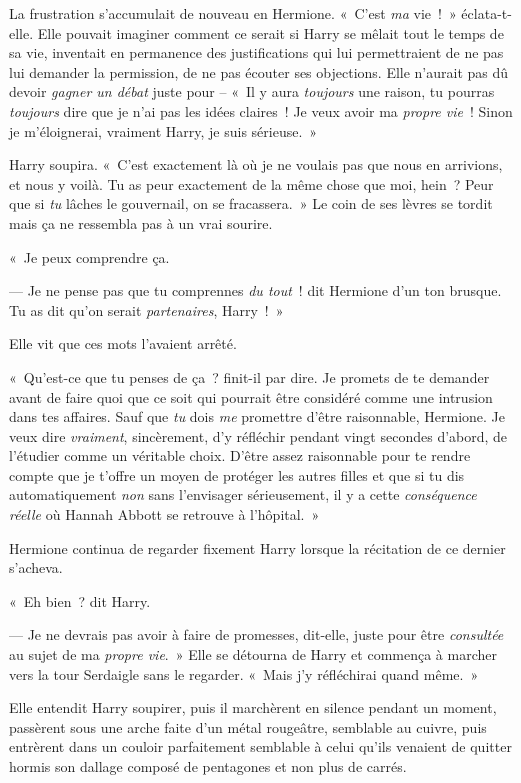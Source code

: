 La frustration s'accumulait de nouveau en Hermione.
«~C'est \emph{ma} vie~!~»
éclata-t-elle.
Elle pouvait imaginer comment ce serait si Harry se mêlait tout le temps de sa vie, inventait en permanence des justifications qui lui permettraient de ne pas lui demander la permission, de ne pas écouter ses objections.
Elle n'aurait pas dû devoir \emph{gagner un débat} juste pour -- «~Il y aura \emph{toujours} une raison, tu pourras \emph{toujours} dire que je n'ai pas les idées claires~!
Je veux avoir ma \emph{propre vie}~!
Sinon je m'éloignerai, vraiment Harry, je suis sérieuse.~»

Harry soupira.
«~C'est exactement là où je ne voulais pas que nous en arrivions, et nous y voilà.
Tu as peur exactement de la même chose que moi, hein~?
Peur que si \emph{tu} lâches le gouvernail, on se fracassera.~»
Le coin de ses lèvres se tordit mais ça ne ressembla pas à un vrai sourire.

«~Je peux comprendre ça.

--- Je ne pense pas que tu comprennes \emph{du tout}~! dit Hermione d'un ton brusque.
Tu as dit qu'on serait \emph{partenaires}, Harry~!~»

Elle vit que ces mots l'avaient arrêté.

«~Qu'est-ce que tu penses de ça~? finit-il par dire.
Je promets de te demander avant de faire quoi que ce soit qui pourrait être considéré comme une intrusion dans tes affaires.
Sauf que \emph{tu} dois \emph{me} promettre d'être raisonnable, Hermione.
Je veux dire \emph{vraiment}, sincèrement, d'y réfléchir pendant vingt secondes d'abord, de l'étudier comme un véritable choix.
D'être assez raisonnable pour te rendre compte que je t'offre un moyen de protéger les autres filles et que si tu dis automatiquement \emph{non} sans l'envisager sérieusement, il y a cette \emph{conséquence réelle} où Hannah Abbott se retrouve à l'hôpital.~»

Hermione continua de regarder fixement Harry lorsque la récitation de ce dernier s'acheva.

«~Eh bien~? dit Harry.

--- Je ne devrais pas avoir à faire de promesses, dit-elle, juste pour être \emph{consultée} au sujet de ma \emph{propre vie}.~»
Elle se détourna de Harry et commença à marcher vers la tour Serdaigle sans le regarder.
«~Mais j'y réfléchirai quand même.~»

Elle entendit Harry soupirer, puis il marchèrent en silence pendant un moment, passèrent sous une arche faite d'un métal rougeâtre, semblable au cuivre, puis entrèrent dans un couloir parfaitement semblable à celui qu'ils venaient de quitter hormis son dallage composé de pentagones et non plus de carrés.

